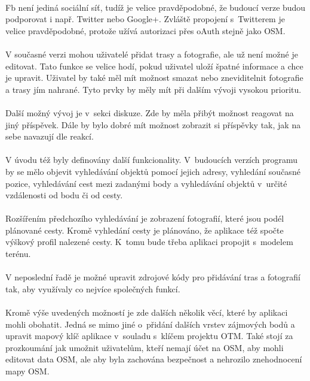\documentclass[11pt,a4paper,titlepage,oneside]{book}
\begin{document}
			\paragraph{}\ac{Fb} není jediná sociální síť, tudíž je velice pravděpodobné, že budoucí verze budou podporovat i např. Twitter nebo Google+. Zvláště propojení s~Twitterem je velice pravděpodobné, protože užívá autorizaci přes oAuth stejně jako \acl{OSM}.
			\paragraph{}V současné verzi mohou uživatelé přidat trasy a fotografie, ale už není možné je editovat. Tato funkce se velice hodí, pokud uživatel uloží špatné informace a chce je upravit. Uživatel by také měl mít možnost smazat nebo zneviditelnit fotografie a trasy jím nahrané. Tyto prvky by měly mít při dalším vývoji vysokou prioritu.
			\paragraph{}Další možný vývoj je v~sekci diskuze. Zde by měla přibýt možnost reagovat na jiný příspěvek. Dále by bylo dobré mít možnost zobrazit si příspěvky tak, jak na sebe navazují dle reakcí.
			\paragraph{}V úvodu též byly definovány další funkcionality. V~budoucích verzích programu by se mělo objevit vyhledávání objektů pomocí jejich adresy, vyhledání současné pozice, vyhledávání cest mezi zadanými body a vyhledávání objektů v~určité vzdálenosti od bodu či od cesty. 
			\paragraph{}Rozšířením předchozího vyhledávání je zobrazení fotografií, které jsou podél plánované cesty. Kromě vyhledání cesty je plánováno, že aplikace též spočte výškový profil nalezené cesty. K~tomu bude třeba aplikaci propojit s~modelem terénu.
			\paragraph{}V neposlední řadě je možné upravit zdrojové kódy pro přidávání tras a fotografií tak, aby využívaly co nejvíce společných funkcí.
			\paragraph{}Kromě výše uvedených možností je zde dalších několik věcí, které by aplikaci mohli obohatit. Jedná se mimo jiné o~přidání dalších vrstev zájmových bodů a upravit mapový klíč aplikace v~souladu s~klíčem projektu \acl{OTM}. Také stojí za prozkoumání jak umožnit uživatelům, kteří nemají účet na \ac{OSM}, aby mohli editovat data \ac{OSM}, ale aby byla zachována bezpečnost a nehrozilo znehodnocení mapy \acl{OSM}.
\end{document}
